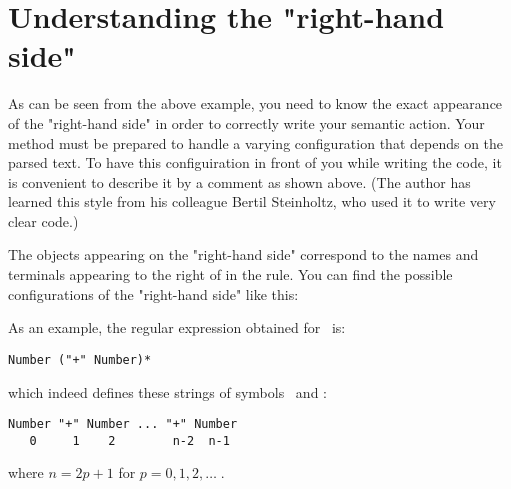 
\section{Understanding the "right-hand side"\label{RHS}}


As can be seen from the above example, you need to know the exact appearance
of the "right-hand side" 
in order to correctly write your semantic action.
Your method must be prepared
to handle a varying configuration that depends on the parsed text.
To have this configuiration in front of you while writing the code,
it is convenient to describe it by a comment as shown above.
(The author has learned this style from his colleague Bertil Steinholtz,
who used it to write very clear  code.) 

The objects appearing on the "right-hand side" 
correspond to the names and terminals appearing to the right of 
in the rule.
You can find the possible configurations of the "right-hand side"
like this:

\smallskip
{}

\medskip
As an example, the regular expression obtained for \Sum\ is:

\small
\begin{Verbatim}[samepage=true,xleftmargin=15mm,baselinestretch=0.8]
 Number ("+" Number)*
\end{Verbatim}
\normalsize

which indeed defines these strings of symbols \Number\ and :

\small
\begin{Verbatim}[samepage=true,xleftmargin=15mm,baselinestretch=0.8]
 Number "+" Number ... "+" Number
   0     1    2        n-2  n-1
\end{Verbatim}
\normalsize

where $n = 2p + 1$ for $p = 0, 1, 2, \ldots\;$.

